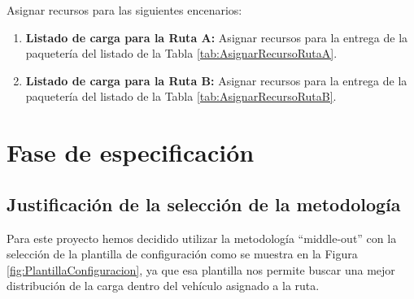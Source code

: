 \begin{table}[H]
  \centering
	\caption{\label{tab:AsignarRecursoRutaC}Lista de paquetes asignados a la Ruta C}
\end{table}

Asignar recursos para las siguientes encenarios:
\begin{enumerate}
	\item  \textbf{Listado de carga para la Ruta A:} Asignar recursos para la entrega de la paquetería del listado de la Tabla \ref{tab:AsignarRecursoRutaA}.
	\item  \textbf{Listado de carga para la Ruta B:} Asignar recursos para la entrega de la paquetería del listado de la Tabla \ref{tab:AsignarRecursoRutaB}.
\end{enumerate}

\section{Fase de especificación}
\subsection{Justificación de la selección de la metodología}
Para este proyecto hemos decidido utilizar la metodología ``middle-out'' con la selección de la plantilla de configuración como se muestra en la Figura \ref{fig:PlantillaConfiguracion}, ya que esa plantilla nos permite buscar una mejor distribución de la carga dentro del vehículo asignado a la ruta. 


